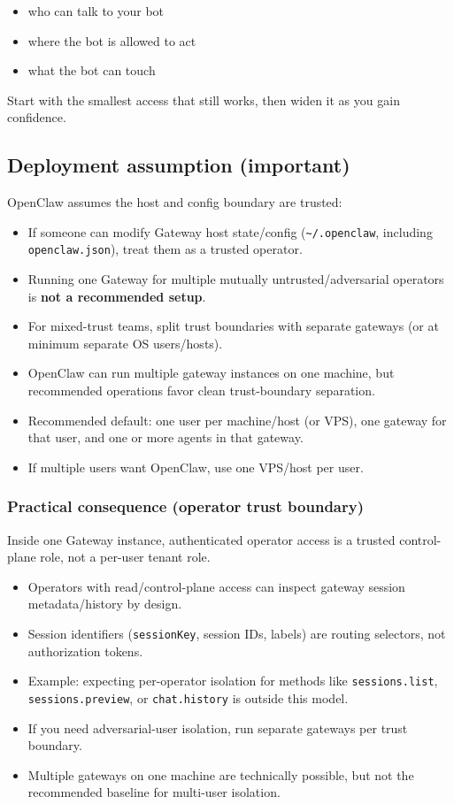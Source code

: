 \begin{itemize}
  \item who can talk to your bot
  \item where the bot is allowed to act
  \item what the bot can touch
\end{itemize}


Start with the smallest access that still works, then widen it as you gain confidence.

\subsection{Deployment assumption (important)}


OpenClaw assumes the host and config boundary are trusted:

\begin{itemize}
  \item If someone can modify Gateway host state/config (\texttt{\textasciitilde{}/.openclaw}, including \texttt{openclaw.json}), treat them as a trusted operator.
  \item Running one Gateway for multiple mutually untrusted/adversarial operators is \textbf{not a recommended setup}.
  \item For mixed-trust teams, split trust boundaries with separate gateways (or at minimum separate OS users/hosts).
  \item OpenClaw can run multiple gateway instances on one machine, but recommended operations favor clean trust-boundary separation.
  \item Recommended default: one user per machine/host (or VPS), one gateway for that user, and one or more agents in that gateway.
  \item If multiple users want OpenClaw, use one VPS/host per user.
\end{itemize}


\subsubsection{Practical consequence (operator trust boundary)}


Inside one Gateway instance, authenticated operator access is a trusted control-plane role, not a per-user tenant role.

\begin{itemize}
  \item Operators with read/control-plane access can inspect gateway session metadata/history by design.
  \item Session identifiers (\texttt{sessionKey}, session IDs, labels) are routing selectors, not authorization tokens.
  \item Example: expecting per-operator isolation for methods like \texttt{sessions.list}, \texttt{sessions.preview}, or \texttt{chat.history} is outside this model.
  \item If you need adversarial-user isolation, run separate gateways per trust boundary.
  \item Multiple gateways on one machine are technically possible, but not the recommended baseline for multi-user isolation.
\end{itemize}


